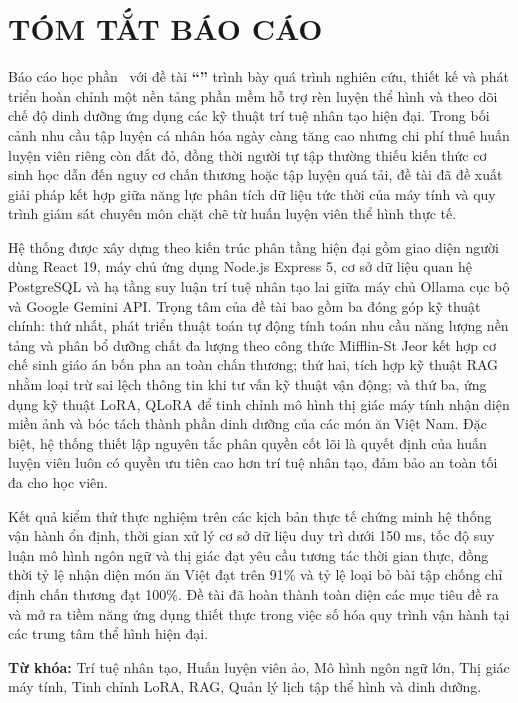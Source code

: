 
\chapter*{TÓM TẮT BÁO CÁO}

Báo cáo học phần \course\ với đề tài \textbf{``\reporttitle''} trình bày quá trình nghiên cứu, thiết kế và phát triển hoàn chỉnh một nền tảng phần mềm hỗ trợ rèn luyện thể hình và theo dõi chế độ dinh dưỡng ứng dụng các kỹ thuật trí tuệ nhân tạo hiện đại. Trong bối cảnh nhu cầu tập luyện cá nhân hóa ngày càng tăng cao nhưng chi phí thuê huấn luyện viên riêng còn đắt đỏ, đồng thời người tự tập thường thiếu kiến thức cơ sinh học dẫn đến nguy cơ chấn thương hoặc tập luyện quá tải, đề tài đã đề xuất giải pháp kết hợp giữa năng lực phân tích dữ liệu tức thời của máy tính và quy trình giám sát chuyên môn chặt chẽ từ huấn luyện viên thể hình thực tế.

Hệ thống được xây dựng theo kiến trúc phân tầng hiện đại gồm giao diện người dùng React 19, máy chủ ứng dụng Node.js Express 5, cơ sở dữ liệu quan hệ PostgreSQL và hạ tầng suy luận trí tuệ nhân tạo lai giữa máy chủ Ollama cục bộ và Google Gemini API. Trọng tâm của đề tài bao gồm ba đóng góp kỹ thuật chính: thứ nhất, phát triển thuật toán tự động tính toán nhu cầu năng lượng nền tảng và phân bổ dưỡng chất đa lượng theo công thức Mifflin-St Jeor kết hợp cơ chế sinh giáo án bốn pha an toàn chấn thương; thứ hai, tích hợp kỹ thuật RAG nhằm loại trừ sai lệch thông tin khi tư vấn kỹ thuật vận động; và thứ ba, ứng dụng kỹ thuật LoRA, QLoRA để tinh chỉnh mô hình thị giác máy tính nhận diện miền ảnh và bóc tách thành phần dinh dưỡng của các món ăn Việt Nam. Đặc biệt, hệ thống thiết lập nguyên tắc phân quyền cốt lõi là quyết định của huấn luyện viên luôn có quyền ưu tiên cao hơn trí tuệ nhân tạo, đảm bảo an toàn tối đa cho học viên.

Kết quả kiểm thử thực nghiệm trên các kịch bản thực tế chứng minh hệ thống vận hành ổn định, thời gian xử lý cơ sở dữ liệu duy trì dưới 150 ms, tốc độ suy luận mô hình ngôn ngữ và thị giác đạt yêu cầu tương tác thời gian thực, đồng thời tỷ lệ nhận diện món ăn Việt đạt trên 91\% và tỷ lệ loại bỏ bài tập chống chỉ định chấn thương đạt 100\%. Đề tài đã hoàn thành toàn diện các mục tiêu đề ra và mở ra tiềm năng ứng dụng thiết thực trong việc số hóa quy trình vận hành tại các trung tâm thể hình hiện đại.

\vspace{1.0cm}
\noindent\textbf{Từ khóa:} Trí tuệ nhân tạo, Huấn luyện viên ảo, Mô hình ngôn ngữ lớn, Thị giác máy tính, Tinh chỉnh LoRA, RAG, Quản lý lịch tập thể hình và dinh dưỡng.

\clearpage
